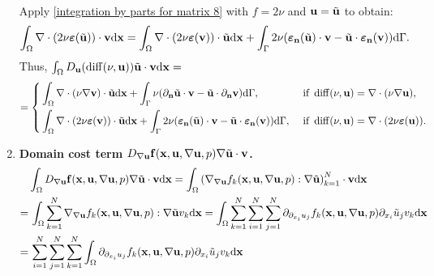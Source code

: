\documentclass[oneside,11pt]{book}
\numberwithin{equation}{section}
\begin{document}
\begin{enumerate}[leftmargin=0mm]
\begin{align*}
    \end{align*}
    Apply \eqref{integration by parts for matrix 8} with $f = 2\nu$ and ${\bf u} = \tilde{\bf u}$ to obtain:
    \begin{align*}
        \int_\Omega \nabla\cdot(2\nu\boldsymbol{\varepsilon}(\tilde{\bf u}))\cdot{\bf v}{\rm d}{\bf x} = \int_\Omega \nabla\cdot(2\nu\boldsymbol{\varepsilon}({\bf v}))\cdot\tilde{\bf u}{\rm d}{\bf x} + \int_\Gamma 2\nu(\boldsymbol{\varepsilon}_{\bf n}(\tilde{\bf u})\cdot{\bf v} - \tilde{\bf u}\cdot\boldsymbol{\varepsilon}_{\bf n}({\bf v})){\rm d}\Gamma.
    \end{align*}
    Thus, $\int_\Omega D_{\bf u}(\operatorname{diff}(\nu,{\bf u}))\tilde{\bf u}\cdot{\bf v}{\rm d}{\bf x} =$
    \begin{equation*}
         = \left\{\begin{split}
            &\int_\Omega \nabla\cdot(\nu\nabla{\bf v})\cdot\tilde{\bf u}{\rm d}{\bf x} + \int_\Gamma \nu(\partial_{\bf n}\tilde{\bf u}\cdot{\bf v} - \tilde{\bf u}\cdot\partial_{\bf n}{\bf v}){\rm d}\Gamma,&&\mbox{ if }\operatorname{diff}(\nu,{\bf u}) = \nabla\cdot(\nu\nabla{\bf u}),\\
            &\int_\Omega \nabla\cdot(2\nu\boldsymbol{\varepsilon}({\bf v}))\cdot\tilde{\bf u}{\rm d}{\bf x} + \int_\Gamma 2\nu(\boldsymbol{\varepsilon}_{\bf n}(\tilde{\bf u})\cdot{\bf v} - \tilde{\bf u}\cdot\boldsymbol{\varepsilon}_{\bf n}({\bf v})){\rm d}\Gamma,&&\mbox{ if } \operatorname{diff}(\nu,{\bf u}) = \nabla\cdot(2\nu\boldsymbol{\varepsilon}({\bf u})).
        \end{split}\right.
    \end{equation*}
    \item \textbf{Domain cost term $D_{\nabla{\bf u}}{\bf f}({\bf x},{\bf u},\nabla{\bf u},p)\nabla\tilde{\bf u}\cdot{\bf v}$.}
    \begin{align*}
        &\int_\Omega D_{\nabla{\bf u}}{\bf f}({\bf x},{\bf u},\nabla{\bf u},p)\nabla\tilde{\bf u}\cdot{\bf v}{\rm d}{\bf x} = \int_\Omega \left(\nabla_{\nabla{\bf u}}f_k({\bf x},{\bf u},\nabla{\bf u},p):\nabla\tilde{\bf u}\right)_{k=1}^N\cdot{\bf v}{\rm d}{\bf x}\\
        =&\,\int_\Omega \sum_{k=1}^N \nabla_{\nabla{\bf u}}f_k({\bf x},{\bf u},\nabla{\bf u},p):\nabla\tilde{\bf u}v_k{\rm d}{\bf x} = \int_\Omega \sum_{k=1}^N\sum_{i=1}^N\sum_{j=1}^N \partial_{\partial_{x_i}u_j}f_k({\bf x},{\bf u},\nabla{\bf u},p)\partial_{x_i}\tilde{u}_jv_k{\rm d}{\bf x}\\
        =&\,\sum_{i=1}^N\sum_{j=1}^N\sum_{k=1}^N \int_\Omega \partial_{\partial_{x_i}u_j}f_k({\bf x},{\bf u},\nabla{\bf u},p)\partial_{x_i}\tilde{u}_jv_k{\rm d}{\bf x}\\

\end{align*}
\end{enumerate}
\end{document}
